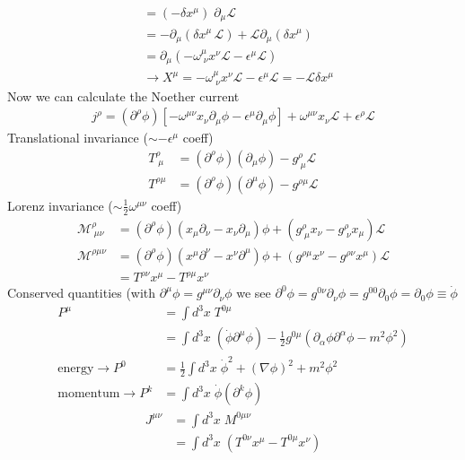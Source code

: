 \documentclass[10pt,a4paper]{report}
\theoremstyle{definition}
\begin{document}
\begin{enumerate}[a)]
\begin{align}
&=(-\delta x^\mu)\;\partial_\mu\mathcal{L}\\
&=-\partial_\mu(\delta x^\mu\,\mathcal{L})+\mathcal{L}\partial_\mu(\delta x^\mu)\\
&=\partial_\mu(-\omega^\mu_{\;\nu} x^\nu\mathcal{L}-\epsilon^\mu \mathcal{L})\\
&\rightarrow X^\mu=-\omega^\mu_{\;\nu} x^\nu\mathcal{L}-\epsilon^\mu \mathcal{L}=-\mathcal{L}\delta x^\mu
\end{align}
Now we can calculate the Noether current
\begin{align}
j^\rho=(\partial^\rho\phi)\left[-\omega^{\mu\nu}x_\nu\partial_\mu\phi-\epsilon^\mu\partial_\mu\phi\right]+\omega^{\mu\nu}x_\nu\mathcal{L}+\epsilon^\rho\mathcal{L}
\end{align}
Translational invariance ($\sim-\epsilon^\mu$ coeff)
\begin{align}
T^\rho_{\;\mu}&=(\partial^\rho\phi)(\partial_\mu\phi)-g^\rho_{\;\mu}\mathcal{L}\\
T^{\rho\mu}&=(\partial^\rho\phi)(\partial^\mu\phi)-g^{\rho\mu}\mathcal{L}
\end{align}
Lorenz invariance ($\sim\frac{1}{2}\omega^{\mu\nu}$ coeff)
\begin{align}
\mathcal{M}^\rho_{\;\mu\nu}&=(\partial^\rho\phi)(x_\mu\partial_\nu-x_\nu\partial_\mu)\phi+(g^\rho_{\;\mu}x_\nu-g^\rho_{\;\nu}x_\mu)\mathcal{L}\\
\mathcal{M}^{\rho\mu\nu}&=(\partial^\rho\phi)(x^\mu\partial^\nu-x^\nu\partial^\mu)\phi+(g^{\rho\mu}x^\nu-g^{\rho\nu}x^\mu)\mathcal{L}\\
&=T^{\rho\nu}x^\mu-T^{\rho\mu}x^\nu
\end{align}
Conserved quantities (with $\partial^\mu\phi=g^{\mu\nu}\partial_\nu\phi$ we see $\partial^0\phi=g^{0\nu}\partial_\nu\phi=g^{00}\partial_0\phi=\partial_0\phi\equiv\dot{\phi}$
\begin{align}
P^\mu
&=\int d^3x\;T^{0\mu}\\
&=\int d^3x\;(\dot\phi\partial^\mu\phi)-\frac{1}{2}g^{0\mu}(\partial_\alpha\phi\partial^\alpha\phi-m^2\phi^2)\\
\text{energy}\rightarrow P^0&=\frac{1}{2}\int d^3x\;\dot{\phi}^2+(\nabla\phi)^2+m^2\phi^2\\
\text{momentum}\rightarrow P^k&=\int d^3x\;\dot{\phi}(\partial^k\phi)
\end{align}
\begin{align}
J^{\mu\nu}
&=\int d^3x\;M^{0\mu\nu}\\
&=\int d^3x\;(T^{0\nu}x^\mu-T^{0\mu}x^\nu)\\

\end{align}
\end{enumerate}
\end{document}
